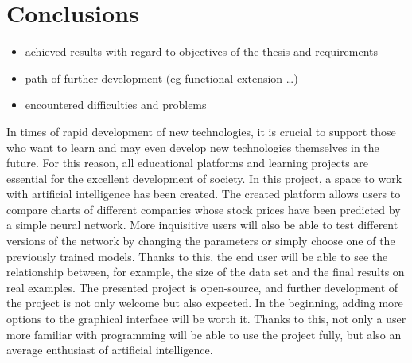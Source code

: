 \chapter{Conclusions}
\begin{itemize}
\item achieved results with regard to objectives of the thesis and requirements
\item path of further development (eg functional extension …)
\item encountered difficulties and problems
\end{itemize}

In times of rapid development of new technologies, it is crucial to support those who want to learn and may even develop new technologies themselves in the future. For this reason, all educational platforms and learning projects are essential for the excellent development of society.
In this project, a space to work with artificial intelligence has been created. The created platform allows users to compare charts of different companies whose stock prices have been predicted by a simple neural network. More inquisitive users will also be able to test different versions of the network by changing the parameters or simply choose one of the previously trained models. Thanks to this, the end user will be able to see the relationship between, for example, the size of the data set and the final results on real examples.
The presented project is open-source, and further development of the project is not only welcome but also expected. In the beginning, adding more options to the graphical interface will be worth it. Thanks to this, not only a user more familiar with programming will be able to use the project fully, but also an average enthusiast of artificial intelligence.